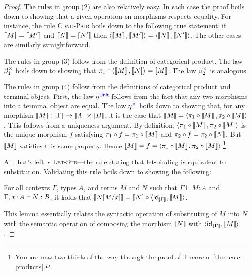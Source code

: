 \begin{proof}
  The rules in group (2) are also relatively easy.
  In each case the proof boils down to showing that
  a given operation on morphisms respects equality.
  For instance, the rule \textsc{Cong-Pair}
  boils down to the following true statement:
  if \(\left\llbracket M\right\rrbracket = \left\llbracket M'\right\rrbracket\)
  and \(\left\llbracket N\right\rrbracket = \left\llbracket N'\right\rrbracket\)
  then \(\langle \left\llbracket M\right\rrbracket,\left\llbracket M'\right\rrbracket\rangle = \langle \left\llbracket N\right\rrbracket,\left\llbracket N'\right\rrbracket\rangle\).
  The other cases are similarly straightforward.

  The rules in group (3) follow from the definition of categorical product.
  The law \(\beta^{\mathbin{{\color{blue}\times}}}_1\) boils down to showing that
  \(\pi_1 \circ \langle \left\llbracket M\right\rrbracket,\left\llbracket N\right\rrbracket\rangle = \left\llbracket M\right\rrbracket\).
  The law \(\beta^{\mathbin{{\color{blue}\times}}}_2\) is analogous.

  The rules in group (4) follow from the definitions of categorical product
  and terminal object. First, the law \(\eta^{\mathsf{{\color{blue}Unit}}}\)
  follows from the fact that any two morphisms into a terminal object are equal.
  The law \(\eta^{\mathbin{{\color{blue}\times}}}\) boils down to showing
  that, for any morphism \(\left\llbracket M\right\rrbracket : \left\llbracket \Gamma\right\rrbracket \to \left\llbracket A\right\rrbracket \times \left\llbracket B\right\rrbracket\),
  it is the case that \(\left\llbracket M\right\rrbracket = \langle \pi_1\circ \left\llbracket M\right\rrbracket, \pi_2\circ\left\llbracket M\right\rrbracket\rangle\).
  This follows from a uniqueness argument.
  By definition, \(\langle \pi_1\circ \left\llbracket M\right\rrbracket, \pi_2\circ\left\llbracket M\right\rrbracket\rangle\)
  is the unique morphism \(f\) satisfying \(\pi_1\circ f = \pi_1 \circ \left\llbracket M\right\rrbracket\)
  and \(\pi_2\circ f = \pi_2 \circ \left\llbracket N\right\rrbracket\). But \(\left\llbracket M\right\rrbracket\)
  satisfies this same property. Hence \(\left\llbracket M\right\rrbracket = f = \langle \pi_1\circ\left\llbracket M\right\rrbracket, \pi_2\circ\left\llbracket M\right\rrbracket\rangle\).\footnote{%
    You are now two thirds of the way through the proof of Theorem~\ref{thm:calc-products}.}

  All that's left is \textsc{Let-Sub}---the rule stating that let-binding is equivalent to substitution.
  Validating this rule boils down to showing the following:
  \begin{lemma} \label{lem:let-is-subst}
    For all contexts \(\Gamma\), types \(A\),
    and terms \(M\) and \(N\)
    such that \(\Gamma \vdash M : A\)
    and \(\Gamma,x\,{:}\, A \vdash N : B\),
    it holds that
    \(\left\llbracket N[M/x]\right\rrbracket = \left\llbracket N\right\rrbracket \circ \langle \mathsf{id}_{\left\llbracket \Gamma\right\rrbracket},\left\llbracket M\right\rrbracket\rangle\).
  \end{lemma}
  This lemma essentially relates
  the syntactic operation of substituting
  of \(M\) into \(N\)
  with the semantic operation
  of composing the morphism \(\left\llbracket N\right\rrbracket\) with \(\langle \mathsf{id}_{\left\llbracket \Gamma\right\rrbracket},\left\llbracket M\right\rrbracket\rangle\).


\end{proof}
